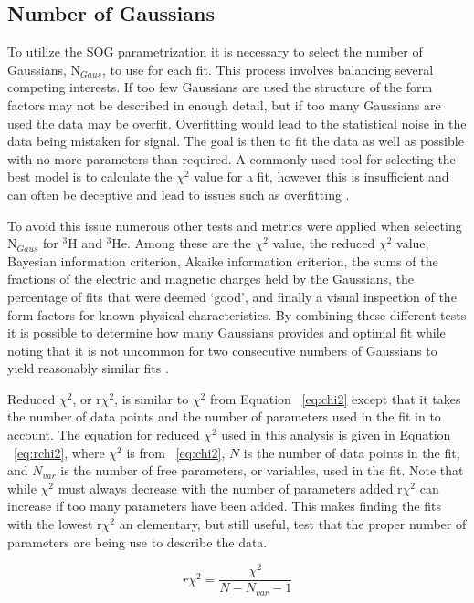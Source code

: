 \subsection{Number of Gaussians}
\label{ssec:ngaus}

To utilize the SOG parametrization it is necessary to select the number of Gaussians, N$_{Gaus}$, to use for each fit. This process involves balancing several competing interests. If too few Gaussians are used the structure of the form factors may not be described in enough detail, but if too many Gaussians are used the data may be overfit. Overfitting would lead to the statistical noise in the data being mistaken for signal. The goal is then to fit the data as well as possible with no more parameters than required. A commonly used tool for selecting the best model is to calculate the $\chi^2$ value for a fit, however this is insufficient and can often be deceptive and lead to issues such as overfitting \cite{doug_stats}. 

To avoid this issue numerous other tests and metrics were applied when selecting N$_{Gaus}$ for $^3$H and $^3$He. Among these are the $\chi^2$ value, the reduced $\chi^2$ value, Bayesian information criterion, Akaike information criterion, the sums of the fractions of the electric and magnetic charges held by the Gaussians, the percentage of fits that were deemed `good', and finally a visual inspection of the form factors for known physical characteristics. By combining these different tests it is possible to determine how many Gaussians provides and optimal fit while noting that it is not uncommon for two consecutive numbers of Gaussians to yield reasonably similar fits \cite{doug_stats}.

Reduced $\chi^2$, or r$\chi^2$, is similar to $\chi^2$ from Equation ~\ref{eq:chi2} except that it takes the number of data points and the number of parameters used in the fit in to account. The equation for reduced $\chi^2$ used in this analysis is given in Equation ~\ref{eq:rchi2}, where $\chi^2$ is from ~\ref{eq:chi2}, $N$ is the number of data points in the fit, and $N_{var}$ is the number of free parameters, or variables, used in the fit. Note that while $\chi^2$ must always decrease with the number of parameters added r$\chi^2$ can increase if too many parameters have been added. This makes finding the fits with the lowest r$\chi^2$ an elementary, but still useful, test that the proper number of parameters are being use to describe the data.

\begin{equation} \label{eq:rchi2}
	r\chi^2 = \frac{\chi^2}{N-N_{var}-1}
\end{equation}

